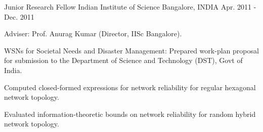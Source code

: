 \begin{cventries}
{\begin{cvitems}
{     		}
      \end{cvitems}
    }

  \cventry
    {Junior Research Fellow} %
    {Indian Institute of Science} %
    {Bangalore, INDIA} %
    {Apr. 2011 - Dec. 2011} %
    {
      \begin{cvitems} %
      \item {Adviser: Prof. Anurag Kumar (Director, IISc Bangalore).}
%      
      \item {WSNs for Societal Needs and Disaster Management: Prepared work-plan proposal for submission to the Department of Science and Technology (DST), Govt of India.}
      \item {Computed closed-formed expressions for network reliability for regular hexagonal network topology.}
      \item {Evaluated information-theoretic bounds on network reliability for random hybrid network topology.}
%      
      \end{cvitems}
    }


\end{cventries}
